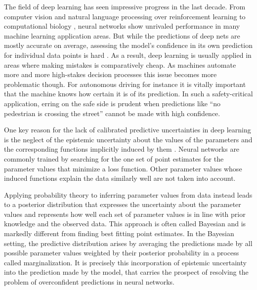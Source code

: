 \documentclass[../thesis.tex]{subfiles}
\begin{document}
The field of deep learning has seen impressive progress in the last decade. From computer vision \parencite{krizhevsky2012imagenet} and natural language processing \parencite{brown2020language} over reinforcement learning \parencite{mnih2015human} to computational biology \parencite{senior2020improved}, neural networks show unrivaled performance in many machine learning application areas. But while the predictions of deep nets are mostly accurate on average, assessing the model's confidence in its own prediction for individual data points is hard \parencite{guo2017calibration}. As a result, deep learning is usually applied in areas where making mistakes is comparatively cheap. As machines automate more and more high-stakes decision processes this issue becomes more problematic though. For autonomous driving for instance it is vitally important that the machine knows how certain it is of its prediction. In such a safety-critical application, erring on the safe side is prudent when predictions like ``no pedestrian is crossing the street'' cannot be made with high confidence.

One key reason for the lack of calibrated predictive uncertainties in deep learning is the neglect of the epistemic uncertainty about the values of the parameters and the corresponding functions implicitly induced by them \parencite{wilson2020bayesian}. Neural networks are commonly trained by searching for the one set of point estimates for the parameter values that minimize a loss function. Other parameter values whose induced functions explain the data similarly well are not taken into account. 

Applying probability theory to inferring parameter values from data instead leads to a posterior distribution that expresses the uncertainty about the parameter values and represents how well each set of parameter values is in line with prior knowledge and the observed data. This approach is often called Bayesian \parencite[p.~xxvii]{murphy2012machine} and is markedly different from finding best fitting point estimates. In the Bayesian setting, the predictive distribution arises by averaging the predictions made by all possible parameter values weighted by their posterior probability in a process called marginalization. It is precisely this incorporation of epistemic uncertainty into the prediction made by the model, that carries the prospect of resolving the problem of overconfident predictions in neural networks.
\end{document}
